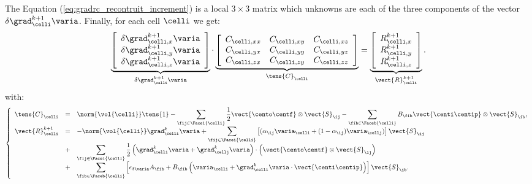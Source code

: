 The Equation (\ref{eq:gradrc_recontruit_increment}) is a local $3 \times 3$ matrix which unknowns are each of the three components of 
the vector $\delta \grad_\celli^{k+1} \varia$. Finally, for each cell $\celli$ we get:
%
\begin{equation}\label{eq:eq_systeme_matriciel_gradrc}
\underbrace{
\left[\begin{array}{c}
\delta \grad_{\celli ,x}^{k+1} \varia\\
\delta \grad_{\celli ,y}^{k+1} \varia\\ 
\delta \grad_{\celli ,z}^{k+1} \varia
\end{array}\right]
}_{\delta \grad_\celli^{k+1} \varia }
\cdot
\underbrace{
\left[\begin{array}{ccc}
\displaystyle
  C_{\celli , xx}
& C_{\celli , xy}
& C_{\celli , xz}\\
\displaystyle
  C_{\celli , yx}
& C_{\celli , yy}
& C_{\celli , yz}\\
\displaystyle
  C_{\celli , zx}
& C_{\celli , zy}
& C_{\celli , zz}
\end{array}\right]
}_{\tens{C}_{\celli}}
=
\underbrace{
\left[\begin{array}{c}
\displaystyle
R^{k+1}_{\celli ,x}\\
\displaystyle
R^{k+1}_{\celli ,y}\\
\displaystyle
R^{k+1}_{\celli ,z}
\end{array}\right]
}_{\vect{R}^{k+1}_{\celli}} . 
\end{equation}
%
with:
%
\begin{equation}\label{eq:eq_second_membre_gradrc}
\left\{\begin{array}{rcl}
\tens{C}_\celli  &=& 
\displaystyle
\norm{\vol{\celli}} \tens{1} - 
\sum\limits_{ \fij \in \Facei{\celli}} \frac{1}{2}  \vect{\cento \centf} \otimes \vect{S}_{\ij} -
\sum\limits_{ \fib \in \Faceb{\celli}} B_{\fib} \vect{\centi \centip}  \otimes \vect{S}_{\ib} ,\\
\vect{R}^{k+1}_{\celli} &=&
\displaystyle 
 -\norm{\vol{\celli}}  \grad_{\celli}^{k} \varia +
\sum\limits_{\fij \in \Facei{\celli}}\left[
(\alpha_{\ij} \varia_\celli + (1 - \alpha_{\ij}) \varia_\cellj)\right] \vect{S}_{\ij} \\
&+& \displaystyle
\sum\limits_{\fij \in \Facei{\celli}} \frac{1}{2} 
\left(\grad_\celli^k \varia + \grad_\cellj^k \varia \right) \cdot \left( \vect{\cento \centf} \otimes \vect{S}_{\ij} \right) \\
&+& \displaystyle 
\sum\limits_{\fib \in \Faceb{\celli}}\left[ \epsilon_{\delta \varia} A_{\fib} 
+ B_{\fib} \left( \varia_\celli + \grad_\celli^k \varia \cdot \vect{\centi \centip} \right)  \right] \vect{S}_{\ib} .
\end{array}\right.
\end{equation}

